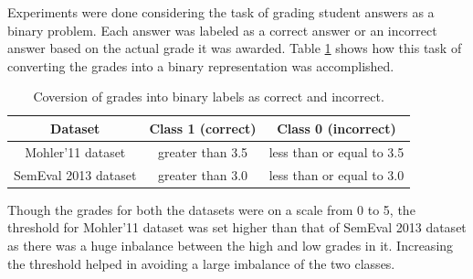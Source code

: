     Experiments were done considering the task of grading student answers as a binary problem. Each answer was labeled as a correct answer or an incorrect answer based on the actual grade it was awarded. Table \ref{binary_grades} shows how this task of converting the grades into a binary representation was accomplished. 
    
    \begin{table}[h]
    	\centering
    	\begin{tabular}{|c|c|c|}
    		\hline
    		\textbf{Dataset}     & \textbf{Class 1 (correct)} & \textbf{Class 0 (incorrect)} \\ \hline
    		Mohler'11 dataset    & greater than 3.5           & less than or equal to 3.5    \\ \hline
    		SemEval 2013 dataset & greater than 3.0           & less than or equal to 3.0    \\ \hline
    	\end{tabular}
    	\caption{Coversion of grades into binary labels as correct and incorrect.}
    	\label{binary_grades}
    \end{table}
    
    
    Though the grades for both the datasets were on a scale from 0 to 5, the threshold for Mohler'11 dataset was set higher than that of SemEval 2013 dataset as there was a huge inbalance between the high and low grades in it. Increasing the threshold helped in avoiding a large imbalance of the two classes. 
    
